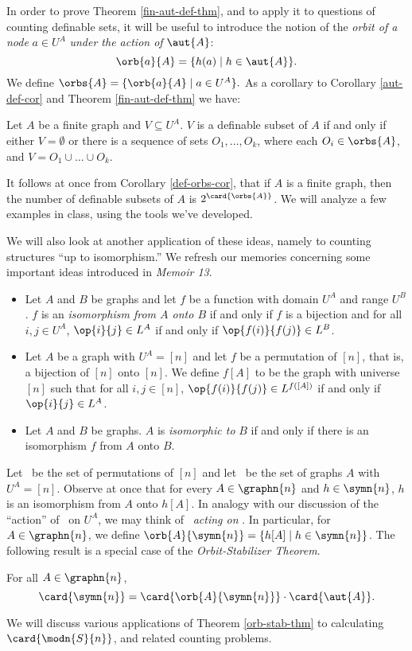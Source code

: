 In order to prove Theorem \ref{fin-aut-def-thm}, and to apply it to questions of counting definable sets, it will be useful to introduce the notion of the \emph{orbit of a node} $a\in U^A$ \emph{under the action of} $\aut{A}$:
\[
\orb{a}{A}=\{h(a)\mid h\in\aut{A}\}.
\]
We define $\orbs{A}=\{\orb{a}{A}\mid a\in U^A\}.$ As a corollary to Corollary \ref{aut-def-cor} and Theorem \ref{fin-aut-def-thm} we have:
\begin{corollary}\label{def-orbs-cor}
Let $A$ be a finite graph and $V\subseteq U^A$. $V$ is a definable subset of $A$ if and only if either $V=\emptyset$ or there is a sequence of sets $O_1, \ldots,O_k$, where each $O_i\in\orbs{A}$, and $V = O_1\cup\ldots\cup O_k$.
\end{corollary}
It follows at once from Corollary \ref{def-orbs-cor}, that if $A$ is a finite graph, then the number of definable subsets of $A$ is $2^{\card{\orbs{A}}}$. We will analyze a few examples in class, using the tools we've developed.

We will also look at another application of these ideas, namely to counting structures ``up to isomorphism.'' We refresh our memories concerning some important ideas introduced in \emph{Memoir 13}.
\begin{itemize}
\item Let $A$ and $B$ be graphs and let $f$ be a function with domain $U^A$ and range $U^B$. $f$ is an \emph{isomorphism from $A$ onto $B$} if and only if $f$ is a bijection and for all $i,j\in U^A$, $\op{i}{j}\in L^A$ if and only if $\op{f(i)}{f(j)}\in L^B$. 
\item Let $A$ be a graph with $U^A=[n]$ and let $f$ be a permutation of $[n]$, that is, a bijection of $[n]$ onto $[n]$. We define $f[A]$ to be the graph with universe $[n]$ such that for all $i,j\in[n]$, $\op{f(i)}{f(j)}\in L^{f([A])}$ if and only if $\op{i}{j}\in L^A$.
\item  Let $A$ and $B$ be graphs. $A$ is \emph{isomorphic to} $B$ if and only if there is an isomorphism $f$ from $A$ onto $B$.
\end{itemize}  
Let \ be the set of permutations of $[n]$ and let \ be the set of graphs $A$ with $U^A = [n]$. Observe at once that for every $A\in\graphn{n}$ and $h\in\symn{n}$, $h$ is an isomorphism from $A$ onto $h[A]$. In analogy with our discussion of the ``action'' of \ on $U^A$, we may think of \ \emph{acting on} . In particular, for $A\in\graphn{n}$, we define $\orb{A}{\symn{n}} = \{h[A]\mid h\in \symn{n}\}$. The following result is a special case of the \emph{Orbit-Stabilizer Theorem}.
\begin{theorem}\label{orb-stab-thm}
For all $A\in\graphn{n}$,
\[
\card{\symn{n}}=\card{\orb{A}{\symn{n}}}\cdot\card{\aut{A}}.
\]
\end{theorem} 
We will discuss various applications of Theorem \ref{orb-stab-thm} to calculating $\card{\modn{S}{n}}$, and related counting problems.
\fi
\fi